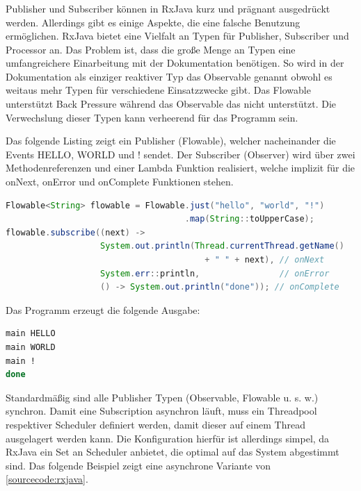 \subsubsection{\criteriaHandhabung}
\label{handling:rxjava}
Publisher und Subscriber können in RxJava kurz und prägnant ausgedrückt werden. Allerdings gibt es einige Aspekte, die eine falsche Benutzung ermöglichen. RxJava bietet eine Vielfalt an Typen für Publisher, Subscriber und Processor an. Das Problem ist, dass die große Menge an Typen eine umfangreichere Einarbeitung mit der Dokumentation benötigen. So wird in der Dokumentation als einziger reaktiver Typ das Observable genannt obwohl es weitaus mehr Typen für verschiedene Einsatzzwecke gibt. Das Flowable unterstützt Back Pressure während das Observable das nicht unterstützt. Die Verwechslung dieser Typen kann verheerend für das Programm sein.

Das folgende Listing zeigt ein Publisher (Flowable), welcher nacheinander die Events HELLO, WORLD und ! sendet. Der Subscriber (Observer) wird über zwei Methodenreferenzen und einer Lambda Funktion realisiert, welche implizit für die onNext, onError und onComplete Funktionen stehen. 

\begin{lstlisting}[language=java,  label={sourcecode:rxjava}, captionpos=t, caption={Synchron: RxJava Hello World}]
Flowable<String> flowable = Flowable.just("hello", "world", "!")
                                    .map(String::toUpperCase);
flowable.subscribe((next) -> 
				   System.out.println(Thread.currentThread.getName() 
				   						+ " " + next), // onNext
                   System.err::println,				   // onError
                   () -> System.out.println("done")); // onComplete
\end{lstlisting}
\clearpage

Das Programm erzeugt die folgende Ausgabe:

\begin{lstlisting}[language=bash,  label=ausgabe, captionpos=t, caption={Ausgabe vom synchronen Code}]
main HELLO
main WORLD
main !
done
\end{lstlisting}

Standardmäßig sind alle Publisher Typen (Observable, Flowable u. s. w.) synchron. Damit eine Subscription asynchron läuft, muss ein Threadpool respektiver Scheduler definiert werden, damit dieser auf einem Thread ausgelagert werden kann. Die Konfiguration hierfür ist allerdings simpel, da RxJava ein Set an Scheduler anbietet, die optimal auf das System abgestimmt sind. Das folgende Beispiel zeigt eine asynchrone Variante von \autoref{sourcecode:rxjava}.


